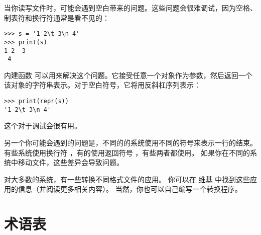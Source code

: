 {{{{{{{当你读写文件时，可能会遇到空白带来的问题。这些问题会很难调试，因为空格、制表符和换行符通常是看不见的：

\begin{lstlisting}
>>> s = '1 2\t 3\n 4'
>>> print(s)
1 2  3
 4
\end{lstlisting}
  


内建函数  可以用来解决这个问题。它接受任意一个对象作为参数，然后返回一个该对象的字符串表示。对于空白符号，它将用反斜杠序列表示：

\begin{lstlisting}
>>> print(repr(s))
'1 2\t 3\n 4'
\end{lstlisting}


这个对于调试会很有用。


另一个你可能会遇到的问题是，不同的的系统使用不同的符号来表示一行的结束。
有些系统使用换行符 ，有的使用返回符号 \li{\r} ，有些两者都使用。
如果你在不同的系统中移动文件，这些差异会导致问题。


对大多数的系统，有一些转换不同格式文件的应用。
你可以在 \href{http://en.wikipedia.org/wiki/Newline}{维基} 中找到这些应用的信息（并阅读更多相关内容）。 当然，你也可以自己编写一个转换程序。


\section{术语表}

}}}}}}}
